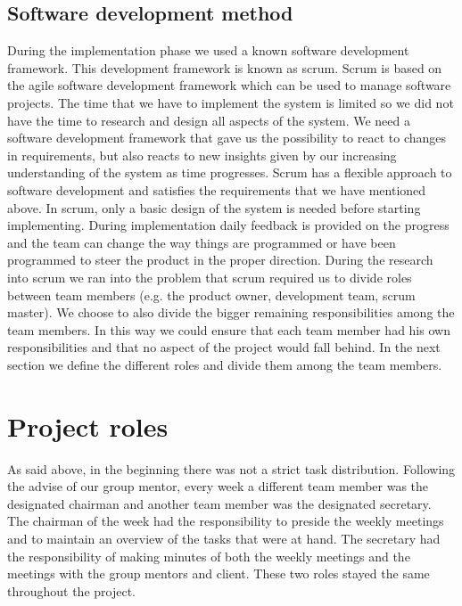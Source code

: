 \subsection{Software development method}\label{software_development_method}
During the implementation phase we used a known software development framework.
This development framework is known as scrum.
Scrum is based on the agile software development framework which can be used to 
manage software projects.
The time that we have to implement the system is limited so we did not have the time to research and design all aspects of the system. We need a software development framework that gave us the possibility to react to changes in requirements, but also reacts to new insights given by our increasing understanding of the system as time progresses.
Scrum has a flexible approach to software development and satisfies the requirements that we have mentioned above.
In scrum, only a basic design of the system is needed before starting implementing.
During implementation daily feedback is provided on the progress and the team can change the way things are programmed or have been programmed to steer the product in the proper direction.
During the research into scrum we ran into the problem that scrum required us to divide roles between team members (e.g. the product owner, development team, scrum master).
We choose to also divide the bigger remaining responsibilities among the team members.
In this way we could ensure that each team member had his own responsibilities and that no aspect of the project would fall behind.
In the next section we define the different roles and divide them among the team members.

\section{Project roles}
As said above, in the beginning there was not a strict task distribution.
Following the advise of our group mentor, every week a different team member was the designated chairman and another team member was the designated secretary.
The chairman of the week had the responsibility to preside the weekly meetings and to maintain an overview of the tasks that were at hand.
The secretary had the responsibility of making minutes of both the weekly meetings and the meetings with the group mentors and client.
These two roles stayed the same throughout the project.

